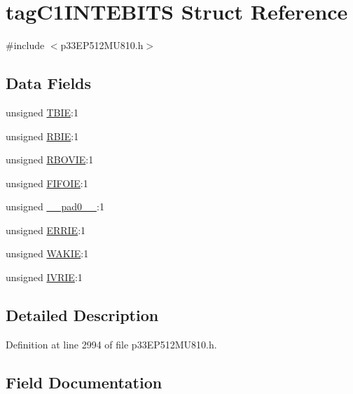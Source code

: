 \hypertarget{structtag_c1_i_n_t_e_b_i_t_s}{}\section{tag\+C1\+I\+N\+T\+E\+B\+I\+TS Struct Reference}
\label{structtag_c1_i_n_t_e_b_i_t_s}


{\ttfamily \#include $<$p33\+E\+P512\+M\+U810.\+h$>$}

\subsection*{Data Fields}
\begin{DoxyCompactItemize}
\item 
unsigned \hyperlink{structtag_c1_i_n_t_e_b_i_t_s_ade1d976453f8686ffc298d08007a2ba2}{T\+B\+IE}\+:1
\item 
unsigned \hyperlink{structtag_c1_i_n_t_e_b_i_t_s_ab20cb587b32c351a91e1b912ce3e29f4}{R\+B\+IE}\+:1
\item 
unsigned \hyperlink{structtag_c1_i_n_t_e_b_i_t_s_a7493513f5f1f051c784baf845722edb2}{R\+B\+O\+V\+IE}\+:1
\item 
unsigned \hyperlink{structtag_c1_i_n_t_e_b_i_t_s_ad78757d4f1cf43e7b7933b2f6d67ea87}{F\+I\+F\+O\+IE}\+:1
\item 
unsigned \hyperlink{structtag_c1_i_n_t_e_b_i_t_s_adf71f3d8410c1f1dbbc96680a92c49af}{\+\_\+\+\_\+pad0\+\_\+\+\_\+}\+:1
\item 
unsigned \hyperlink{structtag_c1_i_n_t_e_b_i_t_s_a099df50d2f2eea6c52f09d4b03693718}{E\+R\+R\+IE}\+:1
\item 
unsigned \hyperlink{structtag_c1_i_n_t_e_b_i_t_s_ad138d5d20a12a9f2753fea9b04492987}{W\+A\+K\+IE}\+:1
\item 
unsigned \hyperlink{structtag_c1_i_n_t_e_b_i_t_s_a568db6cec64f1f25a3e931c1a27a750e}{I\+V\+R\+IE}\+:1
\end{DoxyCompactItemize}


\subsection{Detailed Description}


Definition at line 2994 of file p33\+E\+P512\+M\+U810.\+h.



\subsection{Field Documentation}
\mbox{\label{structtag_c1_i_n_t_e_b_i_t_s_adf71f3d8410c1f1dbbc96680a92c49af}} 
